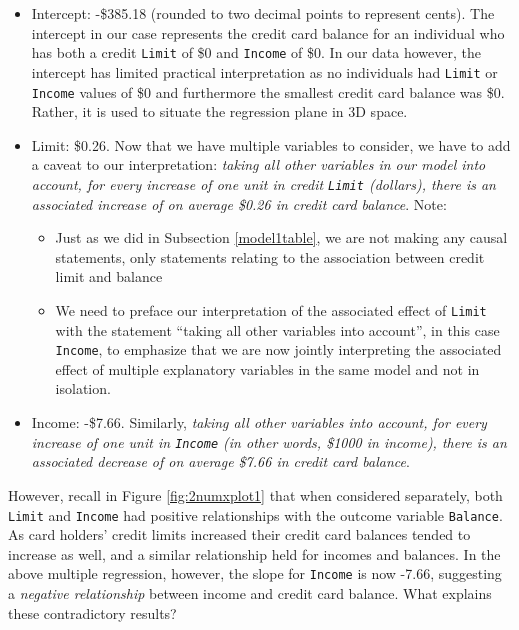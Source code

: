 \documentclass[12pt,]{krantz}
\providecommand{\tightlist}{%
  \setlength{\itemsep}{0pt}\setlength{\parskip}{0pt}}
\theoremstyle{definition}
\theoremstyle{definition}
\theoremstyle{definition}
\theoremstyle{remark}
\begin{document}
\begin{itemize}
\tightlist
\item
  Intercept: -\$385.18 (rounded to two decimal points to represent
  cents). The intercept in our case represents the credit card balance
  for an individual who has both a credit \texttt{Limit} of \$0 and
  \texttt{Income} of \$0. In our data however, the intercept has limited
  practical interpretation as no individuals had \texttt{Limit} or
  \texttt{Income} values of \$0 and furthermore the smallest credit card
  balance was \$0. Rather, it is used to situate the regression plane in
  3D space.
\item
  Limit: \$0.26. Now that we have multiple variables to consider, we
  have to add a caveat to our interpretation: \emph{taking all other
  variables in our model into account, for every increase of one unit in
  credit \texttt{Limit} (dollars), there is an associated increase of on
  average \$0.26 in credit card balance}. Note:

  \begin{itemize}
  \tightlist
  \item
    Just as we did in Subsection \ref{model1table}, we are not making
    any causal statements, only statements relating to the association
    between credit limit and balance
  \item
    We need to preface our interpretation of the associated effect of
    \texttt{Limit} with the statement ``taking all other variables into
    account'', in this case \texttt{Income}, to emphasize that we are
    now jointly interpreting the associated effect of multiple
    explanatory variables in the same model and not in isolation.
  \end{itemize}
\item
  Income: -\$7.66. Similarly, \emph{taking all other variables into
  account, for every increase of one unit in \texttt{Income} (in other
  words, \$1000 in income), there is an associated decrease of on
  average \$7.66 in credit card balance}.
\end{itemize}

However, recall in Figure \ref{fig:2numxplot1} that when considered
separately, both \texttt{Limit} and \texttt{Income} had positive
relationships with the outcome variable \texttt{Balance}. As card
holders' credit limits increased their credit card balances tended to
increase as well, and a similar relationship held for incomes and
balances. In the above multiple regression, however, the slope for
\texttt{Income} is now -7.66, suggesting a \emph{negative relationship}
between income and credit card balance. What explains these
contradictory results?
\end{document}

